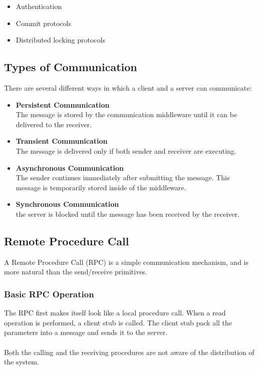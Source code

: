 \documentclass{article}
\begin{document}
\begin{itemize}
	\item Authentication
	\item Commit protocols
	\item Distributed locking protocols
\end{itemize}

\subsection{Types of Communication}
There are several different ways in which a client and a server can communicate:

\begin{itemize}
	\item \textbf{Persistent Communication} \\
	The message is stored by the communication middleware until it can be delivered to the receiver.
	
	\item \textbf{Transient Communication} \\
	The message is delivered only if both sender and receiver are executing.
	
	\item \textbf{Asynchronous Communication} \\
	The sender continues immediately after submitting the message. This message is temporarily stored inside of the middleware.
	
	\item \textbf{Synchronous Communication} \\
	the server is blocked until the message has been received by the receiver.
\end{itemize}

\subsection{Remote Procedure Call}
A Remote Procedure Call (RPC) is a simple communication mechanism, and is more natural than the send/receive primitives.

\subsubsection{Basic RPC Operation}
The RPC first makes itself look like a local procedure call. When a read operation is performed, a client stub is called. The client stub pack all the parameters into a message and sends it to the server. \\ \\
Both the calling and the receiving procedures are not aware of the distribution of the system.
\end{document}
